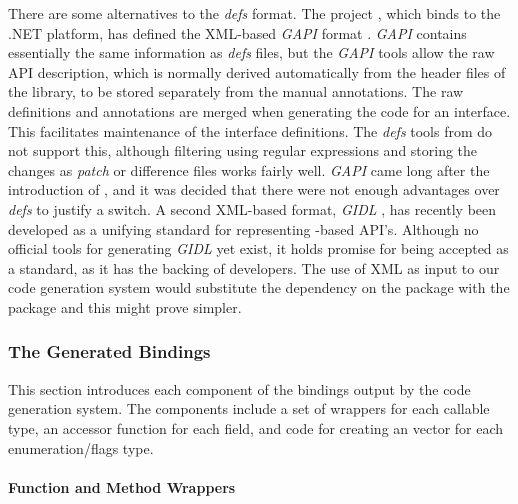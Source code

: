 \documentclass[article]{jss}
\begin{document}
There are some alternatives to the \emph{defs} format. The 
project \citep{gtksharp}, which binds  to the .NET platform, has defined the XML-based \emph{GAPI} format \citep{GAPI}.
\emph{GAPI} contains essentially the same information as \emph{defs}
files,
but the \emph{GAPI} tools allow the raw API description, which is normally derived automatically from the header files of the library, to be stored separately from the manual annotations. The raw definitions and annotations are merged when generating the code for an interface. This facilitates maintenance of the interface definitions. The \emph{defs} tools from  do not support this,
although filtering using regular expressions and storing the changes
as \textsl{patch} or difference files works fairly well. \emph{GAPI}
came long after the introduction of , and it was decided
that there were not enough advantages over \emph{defs} to justify a
switch. A second XML-based format, \emph{GIDL} \citep{gidl}, has
recently been developed as a unifying standard for representing
-based API's. Although no official tools for generating
\emph{GIDL} yet exist, it holds promise for being accepted as a
standard, as it has the backing of  developers. The use of
XML as input to our code generation system would substitute the
dependency on the  package with the  package
and this might prove simpler.

\subsubsection{The Generated Bindings}

This section introduces each component of the bindings output by the code generation system. The components include a set of wrappers for each callable type, an accessor function for each field, and code for creating an  vector for each enumeration/flags type.
 
\paragraph{Function and Method Wrappers}
\end{document}
